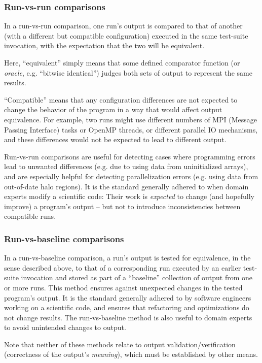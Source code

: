 \documentclass[conference]{IEEEtran}
\begin{document}
\subsubsection{Run-vs-run comparisons}

In a run-vs-run comparison, one run's output is compared to that of another (with a different but compatible configuration) executed in the same test-suite invocation, with the expectation that the two will be equivalent.

Here, ``equivalent'' simply means that some defined comparator function (or \emph{oracle}, e.g. ``bitwise identical'') judges both sets of output to represent the same results.

``Compatible'' means that any configuration differences are not expected to change the behavior of the program in a way that would affect output equivalence. For example, two runs might use different numbers of MPI (Message Passing Interface) tasks or OpenMP threads, or different parallel IO mechanisms, and these differences would not be expected to lead to different output.

Run-vs-run comparisons are useful for detecting cases where programming errors lead to unwanted differences (e.g. due to using data from uninitialized arrays), and are especially helpful for detecting parallelization errors (e.g. using data from out-of-date halo regions). It is the standard generally adhered to when domain experts modify a scientific code: Their work is \emph{expected} to change (and hopefully improve) a program's output -- but not to introduce inconsistencies between compatible runs.

\subsubsection{Run-vs-baseline comparisons}

In a run-vs-baseline comparison, a run's output is tested for equivalence, in the sense described above, to that of a corresponding run executed by an earlier test-suite invocation and stored as part of a ``baseline'' collection of output from one or more runs. This method ensures against unexpected changes in the tested program's output. It is the standard generally adhered to by software engineers working on a scientific code, and ensures that refactoring and optimizations do not change results. The run-vs-baseline method is also useful to domain experts to avoid unintended changes to output.

Note that neither of these methods relate to output validation/verification (correctness of the output's \emph{meaning}), which must be established by other means.
\end{document}
